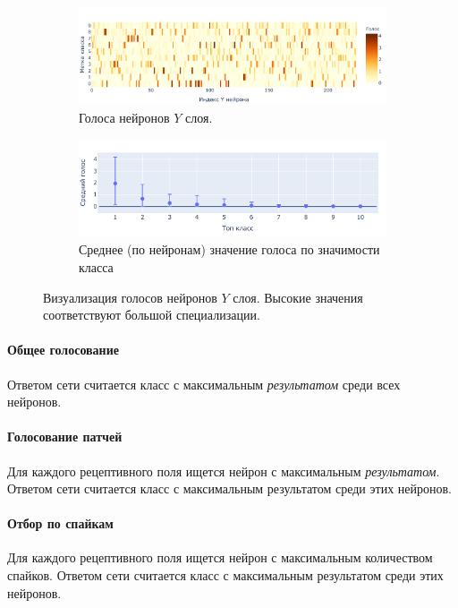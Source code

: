 \documentclass[a4paper]{article}
\begin{document}
\begin{figure}
\centering
\begin{subfigure}{.45\textwidth}
    \includegraphics[width=\textwidth,keepaspectratio=true]{votes_ru.pdf}
    \caption{Голоса нейронов $Y$ слоя.}
\end{subfigure} 
\begin{subfigure}{.45\textwidth} 
    \includegraphics[width=\textwidth,keepaspectratio=true]{votes_distribution_ru.pdf}
    \caption{Среднее (по нейронам) значение голоса по значимости класса}
\end{subfigure}
\caption{Визуализация голосов нейронов $Y$ слоя. Высокие значения соответствуют большой специализации.}
\end{figure}

\paragraph{Общее голосование}
Ответом сети считается класс с максимальным  \textit{результатом} среди всех нейронов.

\paragraph{Голосование патчей}
Для каждого рецептивного поля ищется нейрон с максимальным \textit{результатом}. Ответом сети считается класс с максимальным результатом среди этих нейронов.

\paragraph{Отбор по спайкам}
Для каждого рецептивного поля ищется нейрон с максимальным количеством спайков. Ответом сети считается класс с максимальным результатом среди этих нейронов.
\end{document}
